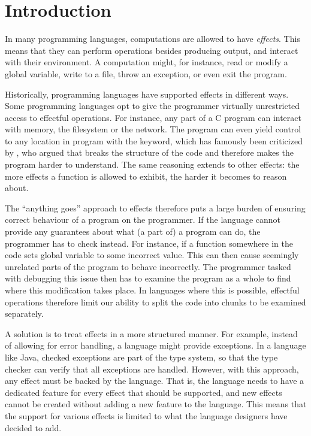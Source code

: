 \chapter{Introduction}\label{chap:introduction}

In many programming languages, computations are allowed to have \emph{effects}. This means that they can perform operations besides producing output, and interact with their environment. A computation might, for instance, read or modify a global variable, write to a file, throw an exception, or even exit the program.

Historically, programming languages have supported effects in different ways. Some programming languages opt to give the programmer virtually unrestricted access to effectful operations. For instance, any part of a C program can interact with memory, the filesystem or the network. The program can even yield control to any location in program with the  keyword, which has famously been criticized by \textcite{dijkstra_letters_1968}, who argued that  breaks the structure of the code and therefore makes the program harder to understand. The same reasoning extends to other effects: the more effects a function is allowed to exhibit, the harder it becomes to reason about.

The ``anything goes'' approach to effects therefore puts a large burden of ensuring correct behaviour of a program on the programmer. If the language cannot provide any guarantees about what (a part of) a program can do, the programmer has to check instead. For instance, if a function somewhere in the code sets global variable to some incorrect value. This can then cause seemingly unrelated parts of the program to behave incorrectly. The programmer tasked with debugging this issue then has to examine the program as a whole to find where this modification takes place. In languages where this is possible, effectful operations therefore limit our ability to split the code into chunks to be examined separately.

A solution is to treat effects in a more structured manner. For example, instead of allowing  for error handling, a language might provide exceptions. In a language like Java, checked exceptions are part of the type system, so that the type checker can verify that all exceptions are handled. However, with this approach, any effect must be backed by the language. That is, the language needs to have a dedicated feature for every effect that should be supported, and new effects cannot be created without adding a new feature to the language. This means that the support for various effects is limited to what the language designers have decided to add.

